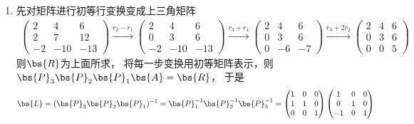 \documentclass[12pt, a4paper, oneside, UTF8]{ctexbook}
\begin{document}
\begin{solution}
    \begin{enumerate}[label=(\arabic*)]
        \item 先对矩阵进行初等行变换变成上三角矩阵
            \begin{align*}
                \begin{pmatrix}
                    2 & 4 & 6\\
                    2&7&12\\
                    -2 & -10& -13
                \end{pmatrix}\xrightarrow{r_2-r_1}
                \begin{pmatrix}
                    2 & 4 & 6\\
                    0&3&6\\
                    -2 & -10& -13
                \end{pmatrix}\xrightarrow{r_3+r_1}
                \begin{pmatrix}
                    2 & 4 & 6\\
                    0&3&6\\
                    0 & -6& -7
                \end{pmatrix}\xrightarrow{r_3+2r_2}
                \begin{pmatrix}
                    2 & 4 & 6\\
                    0&3&6\\
                    0 & 0& 5
                \end{pmatrix}
            \end{align*}
            则$\bs{R}$为上面所求，
            将每一步变换用初等矩阵表示，则$\bs{P}_3\bs{P}_2\bs{P}_1\bs{A}=\bs{R}$，
            于是
            \begin{align*}
                \bs{L}=(\bs{P}_3\bs{P}_2\bs{P}_1)^{-1}
                =\bs{P}_1^{-1}\bs{P}_2^{-1}\bs{P}_3^{-1}
                =\begin{pmatrix}
                    1& 0 &0\\
                    1&1&0\\
                    0&0&1
                \end{pmatrix}
                \begin{pmatrix}
                    1& 0 &0\\
                    0&1&0\\
                    -1&0&1
                \end{pmatrix}

\end{align*}
\end{enumerate}
\end{solution}
\end{document}
